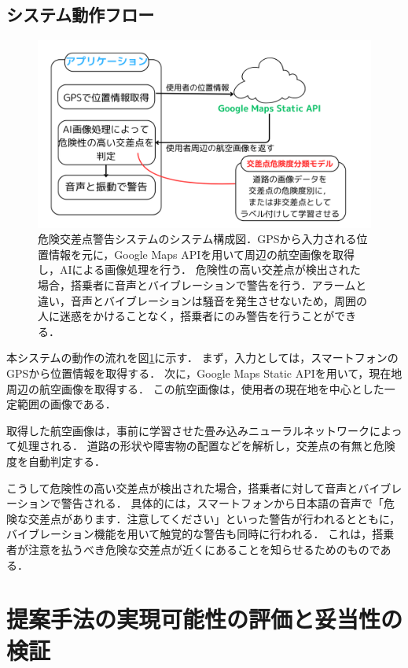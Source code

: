 \documentclass[uplatex,dvipdfmx]{jsarticle}
\begin{document}
\subsection{システム動作フロー}

\begin{figure}[H]
  \centering
  \includegraphics[width=14cm]{./Figs/system_new.png}
  \caption{危険交差点警告システムのシステム構成図．GPSから入力される位置情報を元に，Google Maps APIを用いて周辺の航空画像を取得し，AIによる画像処理を行う．
  危険性の高い交差点が検出された場合，搭乗者に音声とバイブレーションで警告を行う．アラームと違い，音声とバイブレーションは騒音を発生させないため，周囲の人に迷惑をかけることなく，搭乗者にのみ警告を行うことができる．}
  \label{fig:system}
\end{figure}

\indent
本システムの動作の流れを図\ref{fig:system}に示す．
まず，入力としては，スマートフォンのGPSから位置情報を取得する．
次に，Google Maps Static APIを用いて，現在地周辺の航空画像を取得する．
この航空画像は，使用者の現在地を中心とした一定範囲の画像である．
\par
取得した航空画像は，事前に学習させた畳み込みニューラルネットワークによって処理される．
道路の形状や障害物の配置などを解析し，交差点の有無と危険度を自動判定する．
\par
こうして危険性の高い交差点が検出された場合，搭乗者に対して音声とバイブレーションで警告される．
具体的には，スマートフォンから日本語の音声で「危険な交差点があります．注意してください」といった警告が行われるとともに，
バイブレーション機能を用いて触覚的な警告も同時に行われる．
これは，搭乗者が注意を払うべき危険な交差点が近くにあることを知らせるためのものである．
\par


\section{提案手法の実現可能性の評価と妥当性の検証}
\end{document}
